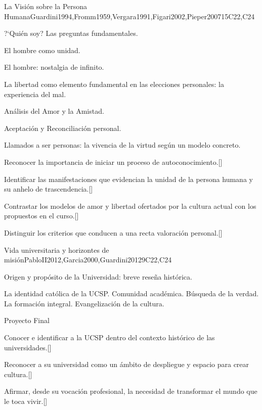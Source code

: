 \begin{syllabus}
\begin{unit}{}{La Visión sobre la Persona Humana}{Guardini1994,Fromm1959,Vergara1991,Figari2002,Pieper2007}{15}{C22,C24}
\begin{topics}
	\item ?`Quién soy? Las preguntas fundamentales.
	\item El hombre como unidad.
	\item El hombre: nostalgia de infinito.
	\item La libertad como elemento fundamental en las elecciones personales: la experiencia del mal.
	\item Análisis del Amor y la Amistad. 
	\item Aceptación y Reconciliación personal.
	\item Llamados a ser personas: la vivencia de la virtud según un modelo concreto.
\end{topics}
\begin{learningoutcomes}
	\item Reconocer la importancia de iniciar un proceso de autoconocimiento.[\Familiarity]
	\item Identificar las manifestaciones que evidencian la unidad de la persona humana y su anhelo de trascendencia.[\Familiarity]
	\item Contrastar los modelos de amor y libertad ofertados por la cultura actual con los propuestos en el curso.[\Familiarity]
	\item Distinguir los criterios que conducen a una recta valoración personal.[\Familiarity]
\end{learningoutcomes}
\end{unit}

\begin{unit}{}{Vida universitaria y horizontes de misión}{PabloII2012,Garcia2000,Guardini2012}{9}{C22,C24}
\begin{topics}
	\item Origen y propósito de la Universidad: breve reseña histórica.
	\item La identidad católica de la UCSP.
		\subitem Comunidad académica.
		\subitem Búsqueda de la verdad.
		\subitem La formación integral.
		\subitem Evangelización de la cultura.
	\item Proyecto Final
\end{topics}
\begin{learningoutcomes}
	\item Conocer e identificar  a la UCSP dentro del contexto histórico de las universidades.[\Familiarity]
	\item Reconocer a su universidad como un ámbito de despliegue y espacio para crear cultura.[\Familiarity]
	\item Afirmar, desde su vocación profesional, la necesidad de transformar el mundo que le toca vivir.[\Familiarity]
\end{learningoutcomes}
\end{unit}

\begin{coursebibliography}
\end{coursebibliography}

\end{syllabus}
